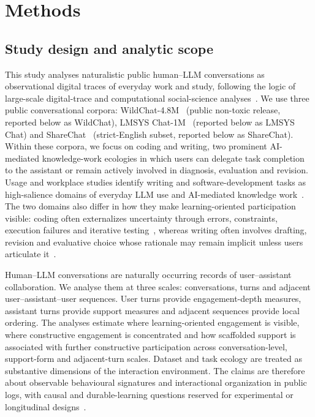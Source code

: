 \section{Methods}\label{sec6}

\subsection{Study design and analytic scope}


This study analyses naturalistic public human--LLM conversations as
observational digital traces of everyday work and study, following the logic of
large-scale digital-trace and computational social-science analyses~\cite{lazer2009computational,salganik2017bitbybit}.
We use three public conversational corpora: WildChat-4.8M~\cite{allenai2025wildchat48m,zhao2024wildchat}
(public non-toxic release, reported below as WildChat), LMSYS Chat-1M~\cite{zheng2023lmsyschat1m} (reported below as LMSYS Chat) and ShareChat~\cite{yan2025sharechat} (strict-English subset, reported below as ShareChat). Within these corpora, we
focus on coding and writing, two prominent AI-mediated knowledge-work ecologies in which users can delegate task completion to the assistant or remain actively involved in diagnosis, evaluation and revision. Usage and workplace
studies identify writing and software-development tasks as high-salience domains of everyday LLM use and AI-mediated knowledge work~\cite{chatterji2025people,handa2025economic,noy2023experimental,brynjolfsson2025generative}. The two domains also differ in how they make learning-oriented participation
visible: coding often externalizes uncertainty through errors, constraints, execution failures and iterative testing~\cite{barke2023grounded,keuning2018systematic},
whereas writing often involves drafting, revision and evaluative choice whose rationale may remain implicit unless users articulate it~\cite{flower1981cognitive,sommers1980revision}.

Human--LLM conversations are naturally occurring records of user--assistant collaboration. 
We analyse them at three scales: conversations, turns and adjacent user--assistant--user sequences. User
turns provide engagement-depth measures, assistant turns provide support measures and adjacent sequences provide local ordering. The analyses estimate where learning-oriented engagement is visible, where constructive engagement is
concentrated and how scaffolded support is associated with further constructive participation across conversation-level, support-form and adjacent-turn scales. Dataset and task ecology are treated as substantive dimensions of the interaction
environment. The claims are therefore about observable behavioural signatures and interactional organization in public logs, with causal and durable-learning questions reserved for experimental or longitudinal designs~\cite{hernan2020causal}.


